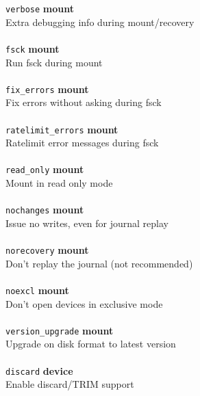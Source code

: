 \documentclass{article}
\begin{document}
\begin{tabbing}
	\texttt{verbose}		\` \textbf{mount}			\\
	\> Extra debugging info during mount/recovery				\\ \\

	\texttt{fsck}			\` \textbf{mount}			\\
	\> Run fsck during mount						\\ \\

	\texttt{fix\_errors}		\` \textbf{mount}			\\
	\> Fix errors without asking during fsck				\\ \\

	\texttt{ratelimit\_errors}	\` \textbf{mount}			\\
	\> Ratelimit error messages during fsck					\\ \\

	\texttt{read\_only}		\` \textbf{mount}			\\
	\> Mount in read only mode						\\ \\

	\texttt{nochanges}		\` \textbf{mount}			\\
	\> Issue no writes, even for journal replay				\\ \\

	\texttt{norecovery}		\` \textbf{mount}			\\
	\> Don't replay the journal (not recommended)				\\ \\

	\texttt{noexcl}			\` \textbf{mount}			\\
	\> Don't open devices in exclusive mode					\\ \\

	\texttt{version\_upgrade}	\` \textbf{mount}			\\
	\> Upgrade on disk format to latest version				\\ \\

	\texttt{discard}		\` \textbf{device}			\\
	\> Enable discard/TRIM support						\\ \\
\end{tabbing}
\end{document}
